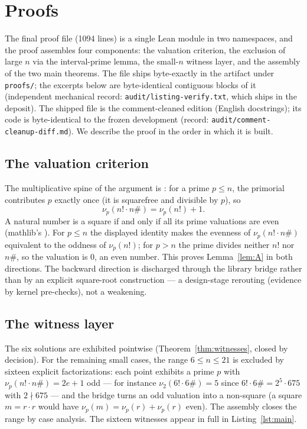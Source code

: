 \documentclass[11pt]{article}
\theoremstyle{definition}
\begin{document}
\section{Proofs}\label{sec:proofs}

The final proof file (1094 lines) is a single Lean module in two
namespaces, and the proof assembles four components: the valuation criterion,
the exclusion of large $n$ via the interval-prime lemma, the small-$n$
witness layer, and the assembly of the two main theorems. The file ships
byte-exactly in the artifact under \texttt{proofs/}; the excerpts below are
byte-identical contiguous blocks of it (independent mechanical record:
\texttt{audit/listing-verify.txt}, which ships in the deposit). The shipped
file is the comment-cleaned edition (English docstrings); its code is
byte-identical to the frozen development (record:
\texttt{audit/comment-cleanup-diff.md}). We describe
the proof in the order in which it is built.

\subsection{The valuation criterion}

The multiplicative spine of the argument is
: for a prime $p \le n$, the
primorial contributes $p$ exactly once (it is squarefree and divisible by
$p$), so
\[
\nu_p(n! \cdot n\#) = \nu_p(n!) + 1.
\]
A natural number is a square if and only if all its prime valuations are
even (mathlib's ). For $p \le n$
the displayed identity makes the evenness of $\nu_p(n! \cdot n\#)$ equivalent
to the oddness of $\nu_p(n!)$; for $p > n$ the prime divides neither $n!$
nor $n\#$, so the valuation is $0$, an even number. This proves
Lemma~\ref{lem:A} in both directions. The backward direction is discharged
through the library bridge rather than by an explicit square-root
construction --- a design-stage rerouting (evidence by kernel pre-checks),
not a weakening.

\subsection{The witness layer}

The six solutions are exhibited pointwise (Theorem~\ref{thm:witnesses},
closed by decision). For the remaining small cases, the range
$6 \le n \le 21$ is excluded by sixteen explicit factorizations: each point
exhibits a prime $p$ with $\nu_p(n! \cdot n\#) = 2e + 1$ odd --- for
instance $\nu_2(6! \cdot 6\#) = 5$ since $6! \cdot 6\# = 2^{5} \cdot 675$
with $2 \nmid 675$ --- and the bridge
 turns an odd valuation into a
non-square (a square $m = r \cdot r$ would have
$\nu_p(m) = \nu_p(r) + \nu_p(r)$ even). The assembly
 closes the range by case analysis. The
sixteen witnesses appear in full in Listing~\ref{lst:main}.
\end{document}
